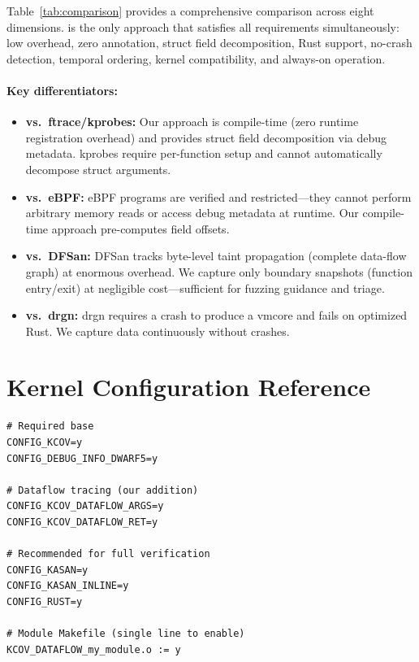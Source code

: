 \documentclass{ndss}
\begin{document}
Table~\ref{tab:comparison} provides a comprehensive comparison across eight
dimensions. \toolname{} is the only approach that satisfies all requirements
simultaneously: low overhead, zero annotation, struct field decomposition, Rust
support, no-crash detection, temporal ordering, kernel compatibility, and
always-on operation.

\paragraph{Key differentiators:}
\begin{itemize}[nosep]
  \item \textbf{vs.\ ftrace/kprobes:} Our approach is compile-time (zero
        runtime registration overhead) and provides struct field decomposition
        via debug metadata. kprobes require per-function setup and cannot
        automatically decompose struct arguments.
  \item \textbf{vs.\ eBPF:} eBPF programs are verified and restricted---they
        cannot perform arbitrary memory reads or access debug metadata at
        runtime. Our compile-time approach pre-computes field offsets.
  \item \textbf{vs.\ DFSan:} DFSan tracks byte-level taint propagation
        (complete data-flow graph) at enormous overhead. We capture only
        boundary snapshots (function entry/exit) at negligible cost---sufficient
        for fuzzing guidance and triage.
  \item \textbf{vs.\ drgn:} drgn requires a crash to produce a vmcore and
        fails on optimized Rust. We capture data continuously without crashes.
\end{itemize}

\section{Kernel Configuration Reference}\label{app:kconfig}

\begin{lstlisting}[numbers=none]
# Required base
CONFIG_KCOV=y
CONFIG_DEBUG_INFO_DWARF5=y

# Dataflow tracing (our addition)
CONFIG_KCOV_DATAFLOW_ARGS=y
CONFIG_KCOV_DATAFLOW_RET=y

# Recommended for full verification
CONFIG_KASAN=y
CONFIG_KASAN_INLINE=y
CONFIG_RUST=y

# Module Makefile (single line to enable)
KCOV_DATAFLOW_my_module.o := y
\end{lstlisting}
\end{document}
